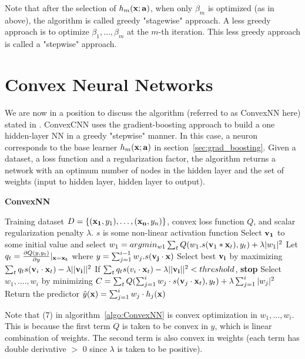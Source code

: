 \documentclass{article}
\begin{document}
Note that after the selection of $h_m({\bf x; a})$, when only $\beta_m$ is optimized (as in above), the algorithm is called greedy "stagewise" approach. A less greedy approach is to optimize $\beta_1, \dots, \beta_m$ at the $m$-th iteration. This less greedy approach is called a "stepwise" approach.   

\section{Convex Neural Networks}

We are now in a position to discuss the algorithm (referred to as ConvexNN here) stated in \cite{bengio2005convex}. ConvexCNN uses the gradient-boosting approach to build a one hidden-layer NN in a greedy "stepwise" manner. In this case, a neuron corresponds to the base learner $h_m({\bf x; a})$ in section~\ref{sec:grad_boosting}. Given a dataset, a loss function and a regularization factor, the algorithm returns a network with an optimum number of nodes in the hidden layer and the set of weights (input to hidden layer, hidden layer to output).

\begin{algorithm}
\caption{{\bf ConvexNN}}\label{algo:ConvexNN}
\begin{algorithmic}[1]
 Training dataset $D = \{({\bf x_1}, y_1), \dots, ({\bf x_n}, y_n)\}$, convex loss function $Q$, and scalar regularization penalty $\lambda$. $s$ is some non-linear activation function 
\STATE Select ${\bf v_1}$ to some initial value and select $w_1 = argmin_{w1} \sum_t Q(w_1.s({\bf v}_1 * {\bf x}_t), y_t) + \lambda |w_1|^2$
\STATE Let $q_t = \frac{\partial Q(y, y_t)}{\partial y}|_{\bf x = x_t}$ where $y = \sum_{j = 1}^{i - 1} w_j . s({\bf v_j} \cdot \bf{x})$
\STATE Select best ${\bf v_i}$ by maximizing $\sum_{t} q_t s({\bf v}_i \cdot {\bf x}_t) - \lambda ||{\bf v_i}||^2$ 
\STATE If $\sum_{t} q_t s(v_i \cdot {\bf x}_t) - \lambda ||{\bf v_i}||^2 < threshold$, {\bf stop}
\STATE Select $w_1, ...., w_i$ by minimizing $C =  \sum_t Q(\sum_{j = 1}^{i} w_j \cdot s({\bf v}_j \cdot {\bf x}_t), y_t) + \lambda \sum_{j = 1}^{i}|w_j|^2$
\ENDFOR
\STATE Return the predictor $\hat{y}({\bf x}) = \sum_{j = 1}^{i} w_j \cdot h_j({\bf x})$ 
\end{algorithmic}
\end{algorithm}

Note that (7) in algorithm~\ref{algo:ConvexNN} is convex optimization in $w_1, \dots, w_i$. This is because the first term $Q$ is taken to be convex in $y$, which is linear combination of weights. The second term is also convex in weights (each term has double derivative $>$ 0 since $\lambda$ is taken to be positive).
\end{document}
